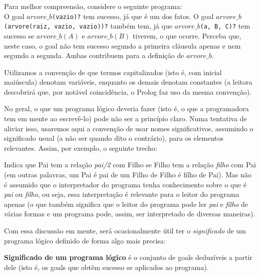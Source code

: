 \documentclass{article}
\begin{document}
Para melhor compreensão, considere o seguinte programa:\\



O goal {\tt $arvore\_b$(vazio)?} tem sucesso, já que é um dos fatos. O goal {\tt $arvore\_b$(arvore(raiz, vazio, vazio))?} também tem, já que {\tt $arvore\_b$(a, B, C)?} tem sucesso se $arvore\_b(A)$ e $arvore\_b(B)$ tiverem, o que ocorre. Perceba que, neste caso, o goal não tem sucesso segundo a primeira cláusula apenas e nem segundo a segunda. Ambas contribuem para a definição de $arvore\_b$.

Utilizamos a convenção de que termos capitalizados (isto é, com inicial maiúscula) denotam variáveis, enquanto os demais denotam constantes (a leitora descobrirá que, por notável coincidência, o Prolog faz uso da mesma convenção).

No geral, o que um programa lógico deveria fazer (isto é, o que a programadora tem em mente ao escrevê-lo) pode não ser a princípio claro. Numa tentativa de aliviar isso, usaremos aqui a convenção de usar nomes significativos, assumindo o significado usual (a não ser quando dito o contrário), para os elementos relevantes. Assim, por exemplo, o seguinte trecho:


\label{lst:pai_filho}


Indica que Pai tem a relação \textit{pai/2} com Filho se Filho tem a relação \textit{filho} com Pai (em outras palavras, um Pai é pai de um Filho de Filho é filho de Pai). Mas não é assumido que o interpretador do programa tenha conhecimento sobre o que é \textit{pai} ou \textit{filho}, ou seja, essa interpretação é relevante para o leitor do programa apenas (o que também significa que o leitor do programa pode ler \textit{pai} e \textit{filho} de várias formas e um programa pode, assim,
ser interpretado de diversas maneiras).

Com essa discussão em mente, será ocasionalmente útil ter o \textit{significado} de um programa lógico definido de forma algo mais precisa:

  \theoremstyle{definition}
  \begin{definition} \textbf{Significado de um programa lógico} é o conjunto de goals deduzíveis a partir dele (isto é, os goals que obtêm sucesso se aplicados ao programa).
  \end{definition}
\end{document}
